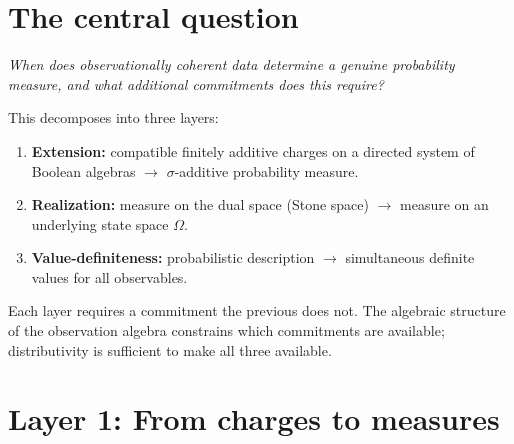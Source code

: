 
\maketitle

\begin{abstract}
A consolidated reference covering everything explored in this
research programme: what I understand, what is known (and by whom),
what I proved that turned out to be classical, what remains
genuinely open, and where the understanding might lead.  Not a
paper.  A map for finding the next problem.
\end{abstract}

\tableofcontents

\section{The central question}

\emph{When does observationally coherent data determine a genuine
probability measure, and what additional commitments does this
require?}

This decomposes into three layers:
\begin{enumerate}
  \item \textbf{Extension:} compatible finitely additive charges
    on a directed system of Boolean algebras
    $\to$ $\sigma$-additive probability measure.
  \item \textbf{Realization:} measure on the dual space (Stone
    space) $\to$ measure on an underlying state space $\Omega$.
  \item \textbf{Value-definiteness:} probabilistic description
    $\to$ simultaneous definite values for all observables.
\end{enumerate}

Each layer requires a commitment the previous does not.
The algebraic structure of the observation algebra constrains
which commitments are available; distributivity is sufficient to
make all three available.

\section{Layer 1: From charges to measures}
\label{sec:extension}

